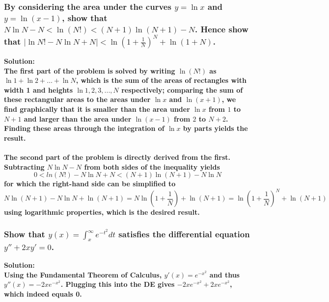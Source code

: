 \documentclass{article}
\begin{document}
\subsubsection*{By considering the area under the curves $y = \ln x$ and $y = \ln (x-1)$, show that $N \ln N - N < \ln(N!) < (N+1)\ln (N+1) - N$. Hence show that $|\ln N! - N \ln N + N| < \ln (1+\frac{1}{N})^N + \ln(1+N)$.}
\bf Solution: \\
\normalfont The first part of the problem is solved by writing $\ln(N!)$ as $\ln 1 + \ln 2 + \dots + \ln N$, which is the sum of the areas of rectangles with width 1 and heights $\ln 1, 2, 3, ..., N$ respectively;
comparing the sum of these rectangular areas to the areas under $\ln x$ and $\ln (x+1)$, we find graphically that it is smaller than the area under $\ln x$ from $1$ to $N+1$ and larger than the area under $\ln (x-1)$ from $2$ to $N+2$. 
Finding these areas through the integration of $\ln x$ by parts yields the result.
\\
\\
The second part of the problem is directly derived from the first. Subtracting $N \ln N - N$ from both sides of the inequality yields
\begin{equation*}
0 < ln(N!) - N\ln N + N < (N+1)\ln (N+1) - N \ln N
\end{equation*}
for which the right-hand side can be simplified to
\begin{equation*}
N \ln (N+1) - N \ln N + \ln (N+1) = N \ln (1 + \frac{1}{N}) + \ln (N+1) = \ln (1+\frac{1}{N})^N + \ln (N+1)
\end{equation*}
using logarithmic properties, which is the desired result.

\hrulefill
\subsubsection*{Show that $y(x) = \int_{x}^{\infty} e^{-t^2} dt$ satisfies the differential equation $y'' + 2xy' = 0$.}
\bf Solution: \\
\normalfont
Using the Fundamental Theorem of Calculus, $y'(x) = e^{-x^2}$ and thus $y''(x) = -2x e^{-x^2}$. Plugging this into the DE gives $-2x e^{-x^2} + 2x e^{-x^2}$, which indeed equals 0. 

\hrulefill
\end{document}

